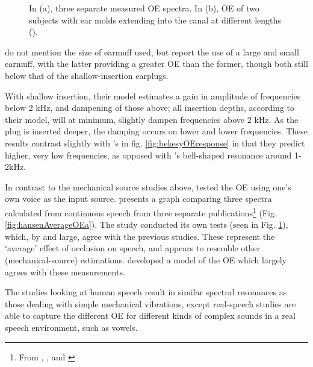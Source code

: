 \documentclass[dissertation,copyright]{uathesis}
\begin{document}
\begin{figure}
\begin{subfigure}{0.5\textwidth}
\begin{subfigure}{0.8\textwidth}
  \end{subfigure}
  \caption{ }
  \label{fig:hansenAverageOEb}
\end{subfigure}
\caption{In (a), three separate measured OE spectra. In (b), OE of two subjects with ear molds extending into the canal at different lengths (\cite{hansen:97b}).}
\label{fig:hansenAverageOE}
\end{figure}
%
\cite{dean:00} do not mention the size of earmuff used, but \cite{stenfelt:07} report the use of a large and small earmuff, with the latter providing a greater OE than the former, though both still below that of the shallow-insertion earplugs.

With shallow insertion, their model estimates a gain in amplitude of frequencies below 2 kHz, and dampening of those above; all insertion depths, according to their model, will at minimum, slightly dampen frequencies above 2 kHz.  As the plug is inserted deeper, the damping occurs on lower and lower frequencies. These results contrast slightly with \cite{bekesy:60}'s in fig. \ref{fig:bekesyOEresponse} in that they predict higher, very low frequencies, as opposed with \cite{bekesy:60}'s bell-shaped resonance around 1-2kHz.


In contrast to the mechanical source studies above, \cite{hansen:97b} tested the OE using one's own voice as the input source.  \cite{hansen:97b} presents a graph comparing three spectra calculated from continuous speech from three separate publications\footnote{From \cite{wimmer:86}, \cite{thorup:96}, and \cite{may:92}} (Fig. \ref{fig:hansenAverageOEa}).  The study conducted its own tests (seen in Fig. \ref{fig:hansenAverageOEb}), which, by and large, agree with the previous studies.  
These represent the `average' effect of occlusion on speech, and appears to resemble other (mechanical-source) estimations.  \cite{hansen:97b} developed a model of the OE which largely agrees with these measurements.

The studies looking at human speech result in similar spectral resonances as those dealing with simple mechanical vibrations, except real-speech studies are able to capture the different OE for different kinds of complex sounds in a real speech environment, such as vowels.  
\end{document}
